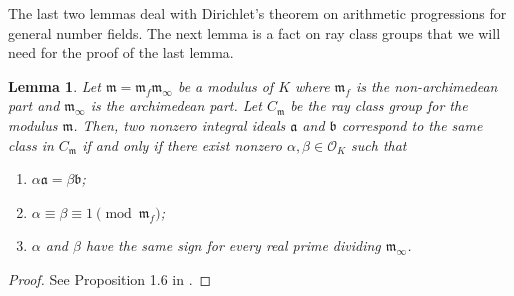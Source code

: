 \documentclass[11pt]{amsart}
\newtheorem{lemma}[theorem]{Lemma}
\theoremstyle{remark}
\newcommand\fr[1]{\mathfrak{#1}}
\newcommand{\clo}{\mathcal{O}}
\begin{document}
The last two lemmas deal with Dirichlet's theorem on arithmetic progressions for general number fields. The next lemma is a fact on ray class groups that we will need for the proof of the last lemma.

\begin{lemma}
\label{rayclass}
Let $\fr{m}=\fr{m}_f\fr{m}_\infty$ be a modulus of $K$ where $\fr{m}_f$ is the non-archimedean part and $\fr{m}_\infty$ is the archimedean part. Let $C_\fr{m}$ be the ray class group for the modulus $\fr{m}$. Then, two nonzero integral ideals $\fr{a}$ and $\fr{b}$ correspond to the same class in $C_\fr{m}$ if and only if there exist nonzero $\alpha,\beta\in\clo_K$ such that
\begin{enumerate}[label=\rm{(\roman*)}]
    \item $\alpha\fr{a}=\beta\fr{b}$;
    \item $\alpha\equiv\beta\equiv1\pmod{\fr{m}_f}$;
    \item $\alpha$ and $\beta$ have the same sign for every real prime dividing $\fr{m}_\infty$.
\end{enumerate}
\end{lemma}
\begin{proof}
See Proposition 1.6 in \cite[Chapter~V]{milne}.
\end{proof}
\end{document}
